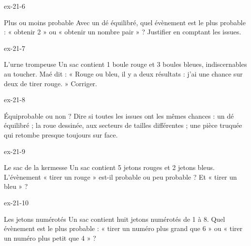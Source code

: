 \begin{blocLivre}{ex-21-6}\begin{exercice}[2]{Plus ou moins probable}
Avec un dé équilibré, quel évènement est le plus probable : « obtenir 2 » ou « obtenir un nombre pair » ? Justifier en comptant les issues.
\label{fig-ex-21-6}
\end{exercice}\end{blocLivre}
\begin{blocLivre}{ex-21-7}\begin{exercice}[2]{L’urne trompeuse}
Un sac contient 1 boule rouge et 3 boules bleues, indiscernables au toucher. Maé dit : « Rouge ou bleu, il y a deux résultats : j’ai une chance sur deux de tirer rouge. » Corriger.
\label{fig-ex-21-7}
\end{exercice}\end{blocLivre}
\begin{blocLivre}{ex-21-8}\begin{exercice}[2]{Équiprobable ou non ?}
Dire si toutes les issues ont les mêmes chances : un dé équilibré ; la roue dessinée, aux secteurs de tailles différentes ; une pièce truquée qui retombe presque toujours sur face.
\label{fig-ex-21-8}
\end{exercice}\end{blocLivre}
\begin{blocLivre}{ex-21-9}\begin{exercice}[2]{Le sac de la kermesse}
Un sac contient 5 jetons rouges et 2 jetons bleus. L’évènement « tirer un rouge » est-il probable ou peu probable ? Et « tirer un bleu » ?
\label{fig-ex-21-9}
\end{exercice}\end{blocLivre}
\begin{blocLivre}{ex-21-10}\begin{exercice}[2]{Les jetons numérotés}
Un sac contient huit jetons numérotés de 1 à 8. Quel évènement est le plus probable : « tirer un numéro plus grand que 6 » ou « tirer un numéro plus petit que 4 » ?
\end{exercice}\end{blocLivre}

